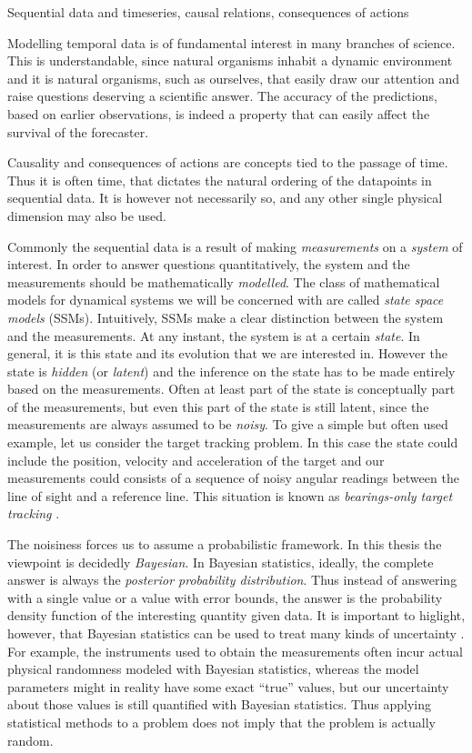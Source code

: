 Sequential data and timeseries, causal relations, consequences of actions

Modelling temporal data is of fundamental interest in many branches of science.
This is understandable, since natural organisms inhabit a dynamic environment and
it is natural organisms, such as ourselves, that easily draw our attention and raise questions
deserving a scientific answer. The accuracy of the predictions, based on earlier observations,
is indeed a property that can easily affect the survival of the forecaster.  

Causality and consequences of actions are concepts tied to the passage of time.
Thus it is often time, that dictates the natural ordering of the datapoints
in sequential data. It is however not necessarily so, and any other single
physical dimension may also be used.

Commonly the sequential data is a result of making \emph{measurements} on a
\emph{system} of interest. In order to answer questions quantitatively,
the system and the measurements should be mathematically \emph{modelled}. The class of mathematical
models for dynamical systems we will be concerned with are called \emph{state space models} (SSMs).
Intuitively, SSMs make a clear distinction between the system and the measurements. At any instant,
the system is at a certain \emph{state}. In general, it is this state and its evolution that we are interested in.
However the state is \emph{hidden} (or \emph{latent}) and the inference on the state has to be made entirely
based on the measurements.  Often at least part of the state is conceptually part of the measurements,
but even this part of the state is still latent, since the measurements are always assumed to be \emph{noisy}.
To give a simple but often used example, let us consider the target tracking problem. In this case the state
could include the position, velocity and acceleration of the target and our measurements could consists
of a sequence of noisy angular readings between the line of sight and a reference line. This situation is
known as \emph{bearings-only target tracking} \parencite{ristic2004beyond}.

The noisiness forces us to assume a probabilistic framework. In this thesis the viewpoint
is decidedly \emph{Bayesian}. In Bayesian statistics, ideally, the complete answer
is always the \emph{posterior probability distribution}. Thus instead of answering
with a single value or a value with error bounds, the answer is the probability
density function of the interesting quantity given data. It is important to higlight,
however, that Bayesian statistics can be used to treat many kinds of uncertainty
\parencite{Sarkka2012a}. For example, the instruments used to obtain the measurements often incur
actual physical randomness modeled with Bayesian statistics, whereas the model parameters might in reality have some
exact ``true'' values, but our uncertainty about those values is still quantified with
Bayesian statistics. Thus applying statistical methods to a problem does not imply
that the problem is actually random.

